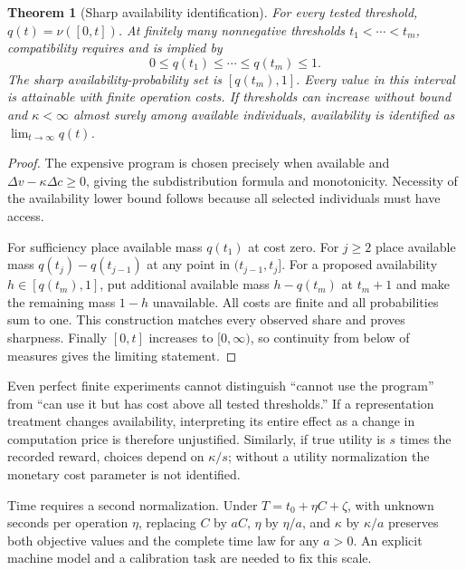 \documentclass[11pt]{article}
\newtheorem{theorem}{Theorem}
\theoremstyle{remark}
\begin{document}
\begin{theorem}[Sharp availability identification]
For every tested threshold, $q(t)=\nu([0,t])$. At finitely many nonnegative thresholds $t_1<\cdots<t_m$, compatibility requires and is implied by
\[
 0\leq q(t_1)\leq\cdots\leq q(t_m)\leq1.
\]
The sharp availability-probability set is $[q(t_m),1]$. Every value in this interval is attainable with finite operation costs. If thresholds can increase without bound and $\kappa<\infty$ almost surely among available individuals, availability is identified as $\lim_{t\to\infty}q(t)$.
\end{theorem}
\begin{proof}
The expensive program is chosen precisely when available and $\Delta v-\kappa\Delta c\geq0$, giving the subdistribution formula and monotonicity. Necessity of the availability lower bound follows because all selected individuals must have access.

For sufficiency place available mass $q(t_1)$ at cost zero. For $j\geq2$ place available mass $q(t_j)-q(t_{j-1})$ at any point in $(t_{j-1},t_j]$. For a proposed availability $h\in[q(t_m),1]$, put additional available mass $h-q(t_m)$ at $t_m+1$ and make the remaining mass $1-h$ unavailable. All costs are finite and all probabilities sum to one. This construction matches every observed share and proves sharpness. Finally $[0,t]$ increases to $[0,\infty)$, so continuity from below of measures gives the limiting statement.
\end{proof}

Even perfect finite experiments cannot distinguish ``cannot use the program'' from ``can use it but has cost above all tested thresholds.'' If a representation treatment changes availability, interpreting its entire effect as a change in computation price is therefore unjustified. Similarly, if true utility is $s$ times the recorded reward, choices depend on $\kappa/s$; without a utility normalization the monetary cost parameter is not identified.

Time requires a second normalization. Under $T=t_0+\eta C+\zeta$, with unknown seconds per operation $\eta$, replacing $C$ by $aC$, $\eta$ by $\eta/a$, and $\kappa$ by $\kappa/a$ preserves both objective values and the complete time law for any $a>0$. An explicit machine model and a calibration task are needed to fix this scale.
\end{document}
